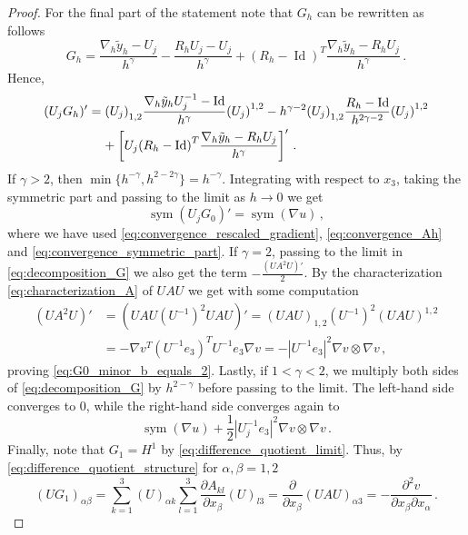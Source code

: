 \documentclass{article}
\theoremstyle{plain}
\theoremstyle{plain}
\theoremstyle{plain}
\theoremstyle{plain}
\theoremstyle{plain}
\theoremstyle{definition}
\theoremstyle{definition}
\newcommand{\dpartial}[2]{\dfrac{\partial#1}{\partial#2}}
\DeclareMathOperator{\Id}{Id}
\DeclareMathOperator{\sym}{sym}
\begin{document}
\begin{proof}
    For the final part of the statement note that $G_h$ can be rewritten as follows
    \[
        G_h = \dfrac{\nabla_h \tilde y_h - U_j}{h^{\gamma}} - \dfrac{R_h U_j - U_j}{h^{\gamma}} + {(R_h - \Id)}^T\dfrac{\nabla_h \tilde y_h - R_h U_j}{h^{\gamma}} \,.
    \]
    Hence,  
    \begin{equation}\label{eq:decomposition_G}
        \begin{aligned}
            (U_j G_h)' & = {(U_j)}_{1,2} \dfrac{\nabla_h \tilde y_h U_j^{-1} - \Id}{h^{\gamma}} {(U_j)}^{1,2} - h^{\gamma - 2}{(U_j)}_{1,2} \dfrac{R_h - \Id}{h^{2\gamma - 2}} {(U_j)}^{1,2} \\
            & \hphantom{=} \, \, + \left[U_j{(R_h - \Id)}^T\dfrac{\nabla_h \tilde y_h - R_h U_j}{h^{\gamma}}\right]' \,.
        \end{aligned}
    \end{equation}
    If $\gamma > 2$, then $\min \{h^{-\gamma}, h^{2-2\gamma}\} = h^{-\gamma}$. Integrating with respect to $x_3$, taking the symmetric part and passing to the limit as $h \to 0$ we get
    \[
        \sym(U_j G_0)' = \sym(\nabla u) \,,
    \]
    where we have used \eqref{eq:convergence_rescaled_gradient}, \eqref{eq:convergence_Ah} and \eqref{eq:convergence_symmetric_part}. If $\gamma = 2$, passing to the limit in \eqref{eq:decomposition_G} we also get the term $-\frac{(UA^2U)'}{2}$. By the characterization \eqref{eq:characterization_A} of $UAU$ we get with some computation
    \begin{align}
        (UA^2U)' & = (UAU (U^{-1})^2 UAU)' = (UAU)_{1, 2} (U^{-1})^2 (UAU)^{1, 2} \\
        & = -\nabla v^T (U^{-1} e_3)^T U^{-1}e_3 \nabla v = - |U^{-1}e_3|^2 \nabla v \otimes \nabla v \,,
    \end{align}
    proving \eqref{eq:G0_minor_b_equals_2}. Lastly, if $1 < \gamma < 2$, we multiply both sides of \eqref{eq:decomposition_G} by $h^{2-\gamma}$ before passing to the limit. The left-hand side converges to $0$, while the right-hand side converges again to
    \[
        \sym(\nabla u) + \dfrac{1}{2}|U_j^{-1} e_3|^2 \nabla v \otimes \nabla v \,.
    \]
    Finally, note that $G_1 = H^1$ by \eqref{eq:difference_quotient_limit}. Thus, by \eqref{eq:difference_quotient_structure} for $\alpha, \beta = 1, 2$
    \begin{equation}
        {(U G_1)}_{\alpha \beta} = \sum_{k=1}^3 {(U)}_{\alpha k} \sum_{l=1}^3 \dpartial{A_{k l}}{x_\beta} {(U)}_{l3} = \dpartial{}{x_\beta} {(UAU)}_{\alpha 3} = - \dfrac{\partial^2 v}{\partial x_\beta \partial x_\alpha} \,.
    \end{equation}
\end{proof}
\end{document}
